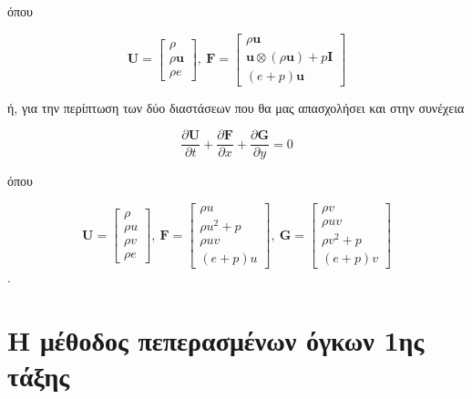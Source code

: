 όπου

\begin{equation*}
    \mathbf{U} = 
        \begin{bmatrix}
            \rho \\
            \rho \mathbf{u} \\
            \rho e
        \end{bmatrix}
    , \ 
    \mathbf{F} =
        \begin{bmatrix}
            \rho \mathbf{u} \\
            \mathbf{u} \otimes \left( \rho \mathbf{u} \right) + p \mathbf{I} \\
            (e + p) \mathbf{u}
        \end{bmatrix}
\end{equation*}

ή, για την περίπτωση των δύο διαστάσεων που θα μας απασχολήσει και στην συνέχεια

\begin{equation*}
    \frac{\partial \mathbf{U}}{\partial t} + \frac{\partial \mathbf{F}}{\partial x} + \frac{\partial \mathbf{G}}{\partial y} = 0
\end{equation*}

όπου

\begin{equation*}
    \mathbf{U} = 
        \begin{bmatrix}
            \rho \\
            \rho u \\
            \rho v \\
            \rho e
        \end{bmatrix}
    , \ 
    \mathbf{F} =
        \begin{bmatrix}
            \rho u \\
            \rho u^2 + p \\
            \rho u v \\
            (e + p) u
        \end{bmatrix}
    , \ 
    \mathbf{G} =
        \begin{bmatrix}
            \rho v \\
            \rho u v \\
            \rho v^2 + p \\
            (e + p) v 
        \end{bmatrix}
\end{equation*}
.

\section{Η μέθοδος πεπερασμένων όγκων 1ης τάξης}
\label{seq:fvm-mol}


